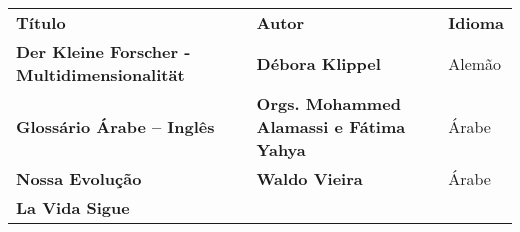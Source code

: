 \begin{longtable}[]{@{}
  >{\raggedright\arraybackslash}p{}
  >{\raggedright\arraybackslash}p{}
  >{\raggedright\arraybackslash}p{}@{}}
\toprule\noalign{}
\begin{minipage}[b]{\linewidth}\centering
\textbf{Título}
\end{minipage} & \begin{minipage}[b]{\linewidth}\centering
\textbf{Autor}
\end{minipage} & \begin{minipage}[b]{\linewidth}\centering
\textbf{Idioma}
\end{minipage} \\
\begin{minipage}[b]{\linewidth}\raggedright
\textbf{Der Kleine Forscher - Multidimensionalität}
\end{minipage} & \begin{minipage}[b]{\linewidth}\raggedright
\textbf{Débora Klippel}
\end{minipage} & \begin{minipage}[b]{\linewidth}\raggedright
Alemão
\end{minipage} \\
\begin{minipage}[b]{\linewidth}\raggedright
\textbf{Glossário Árabe -- Inglês}
\end{minipage} & \begin{minipage}[b]{\linewidth}\raggedright
\textbf{Orgs. Mohammed Alamassi e Fátima Yahya}
\end{minipage} & \begin{minipage}[b]{\linewidth}\raggedright
Árabe
\end{minipage} \\
\begin{minipage}[b]{\linewidth}\raggedright
\textbf{Nossa Evolução}
\end{minipage} & \begin{minipage}[b]{\linewidth}\raggedright
\textbf{Waldo Vieira}
\end{minipage} & \begin{minipage}[b]{\linewidth}\raggedright
Árabe
\end{minipage} \\
\begin{minipage}[b]{\linewidth}\raggedright
\textbf{La Vida Sigue}
\end{minipage} & \begin{minipage}[b]{\linewidth}\raggedright

\end{minipage}
\end{longtable}
